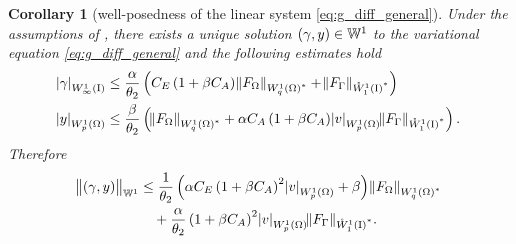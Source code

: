 \documentclass[final]{siamltex}
\newtheorem{cor}[theorem]{Corollary}
\begin{document}
\begin{cor}[well-posedness of the linear system \eqref{eq:g_diff_general}] \label{cor:g_diff_prelim} Under the assumptions of , there exists a unique solution $\del{\gamma,y} \in {\mathbb{W}}^1$ to the variational equation \eqref{eq:g_diff_general} and the following estimates hold
	\begin{align} 
		\label{eq:g_diff_prelim_continuity_gamma}
		{\abs{{\gamma}}_{{W^{{1}}_{{\infty}}\del{{\text{\rm I}}}}}} 
			&\leq \frac{\alpha}{\theta_2}\del{C_E\del{1+\beta C_A}{\norm{{F_\Omega}}_{{{W^{{1}}_{{q}}\del{{\Omega}}}}^*}} + {\norm{{F_\Gamma}}_{{{\mathring{W}^{{1}}_{{1}}\del{{{\text{\rm I}}}}}}^*}}} \\
		\label{eq:g_diff_prelim_continuity_y}
		{\abs{{y}}_{{W^{{1}}_{{p}}\del{{\Omega}}}}}
			&\leq
                        \frac{\beta}{\theta_2}\del{{\norm{{F_\Omega}}_{{{W^{{1}}_{{q}}\del{{\Omega}}}}^*}}
                          + \alpha C_A\del{1+\beta
                            C_A}{\abs{{v}}_{{W^{{1}}_{{p}}\del{{\Omega}}}}}
                          {\norm{{F_\Gamma}}_{{{\mathring{W}^{{1}}_{{1}}\del{{{\text{\rm I}}}}}}^*}}}.
	\end{align}
Therefore
\begin{equation*}
\begin{aligned}
		\norm{\del{\gamma,y}}_{{\mathbb{W}}^1}
			&\leq 
			\frac{1}{\theta_2}
				\del{\alpha C_E\del{1+\beta
                                    C_A}^2{\abs{{v}}_{{W^{{1}}_{{p}}\del{{\Omega}}}}} +
                                  \beta}{\norm{{F_\Omega}}_{{{W^{{1}}_{{q}}\del{{\Omega}}}}^*}}  
                        \\
			&\quad
				+ \frac{\alpha}{\theta_2}\del{1+\beta
                                  C_A}^2{\abs{{v}}_{{W^{{1}}_{{p}}\del{{\Omega}}}}}{\norm{{F_\Gamma}}_{{{\mathring{W}^{{1}}_{{1}}\del{{{\text{\rm I}}}}}}^*}}.
\end{aligned}
\end{equation*}
\end{cor}
\end{document}
